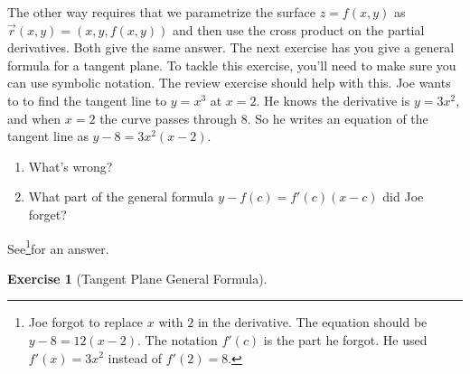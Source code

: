 \documentclass[10pt,]{book}
\theoremstyle{plain}
\theoremstyle{definition}
\theoremstyle{definition}
\theoremstyle{definition}
\theoremstyle{definition}
\newtheorem{exploration}[project]{Exercise}
\theoremstyle{definition}
\numberwithin{equation}{section}
\begin{document}
\par
The other way requires that we parametrize the surface \(z=f(x,y)\) as \(\vec r(x,y)=(x,y,f(x,y))\) and then use the cross product on the partial derivatives. Both give the same answer. The next exercise has you give a general formula for a tangent plane. To tackle this exercise, you'll need to make sure you can use symbolic notation. The review exercise should help with this.%
Joe wants to to find the tangent line to \(y=x^3\) at \(x=2\). He knows the derivative is \(y=3x^2\), and when \(x=2\) the curve passes through \(8\). So he writes an equation of the tangent line as \(y-8=3x^2(x-2)\). \leavevmode%
\begin{enumerate}
\item\hypertarget{li-84}{}What's wrong?%
\item\hypertarget{li-85}{}What part of the general formula \(y-f(c) = f'(c) (x-c)\) did Joe forget?%
\end{enumerate}
%
 \par
See\footnote{Joe forgot to replace \(x\) with \(2\) in the derivative. The equation should be \(y-8=12(x-2)\).  The notation \(f'(c)\) is the part he forgot.  He used \(f'(x)=3x^2\) instead of \(f'(2)=8\).\label{fn-3}}for an answer.%
\begin{exploration}[Tangent Plane General Formula]\label{exploration-148}
\end{exploration}
\typeout{************************************************}
\typeout{************************************************}
\end{document}
